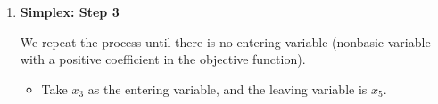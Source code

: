 \begin{enumerate}
    \begin{itemize}
        \item Substitute the entering variable (called ) in other equations

        \item Now, $x_1$ becomes basic and $x_6$ becomes non-basic. 
        
        \item $x_6$ is called the .
    \end{itemize} 
    \[ \color{primary} \begin{matrix}[rcrcrcrcr]
        z    & =    & 27   & +    & \frac{x_2}{4}  & +   & \frac{x_3}{2}  & - & \frac{3x_4}{4} \\
        x_1  & =    & 9    & -    & \frac{x_2}{4}  & -   & \frac{x_3}{2}  & - & \frac{x_4}{4}  \\
        x_4  & =    & 21   & -    & \frac{3x_2}{4} & -   & \frac{5x_3}{2} & + & \frac{x_6}{4}  \\
        x_5  & =    & 6    & -    & \frac{3x_2}{2} & -   & 4x_3           & + & \frac{x_6}{2}  \\
        x_1, & x_2, & x_3, & x_4, & x_5,           & x_6 & \ge            & 0 &
    \end{matrix} \]

    After one iteration of this step, the \textbf{basic feasible solution} (i.e. substituting $0$ for all nonbasic variables) improves from $z = 0$ to $z = 27$.

    \item \textbf{Simplex: Step 3}
    
    We repeat the process until there is no entering variable (nonbasic variable with a positive coefficient in the objective function).  

    \begin{itemize} \color{primary}
        \item Take $x_3$ as the entering variable, and the leaving variable is $x_5$.


\end{itemize}
\end{enumerate}
